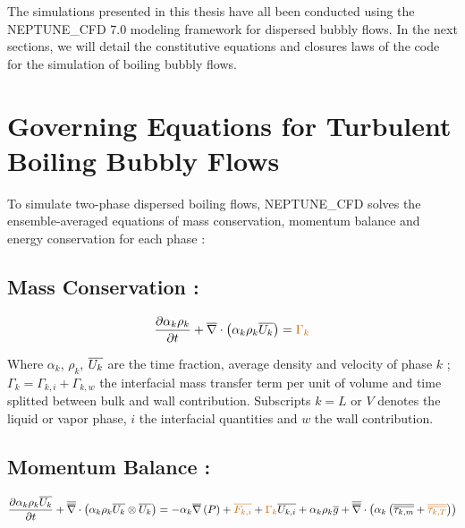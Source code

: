 \npar

The simulations presented in this thesis have all been conducted using the NEPTUNE\_CFD 7.0 modeling framework for dispersed bubbly flows. In the next sections, we will detail the constitutive equations and closures laws of the code for the simulation of boiling bubbly flows.


\section{Governing Equations for Turbulent Boiling Bubbly Flows}

To simulate two-phase dispersed boiling flows, NEPTUNE\_CFD solves the ensemble-averaged equations of mass conservation, momentum balance and energy conservation for each phase : 



\subsection{Mass Conservation :}
\begin{equation}
	\label{eq:mass}
	\dtime{\alpha_{k}\rho_{k}} + \divg{\alpha_{k}\rho_{k} \vect{U_{k}}} = \orangemath{\Gamma_{k}}
\end{equation}

Where $\alpha_{k}$, $\rho_{k}$, $\overline{U_{k}}$ are the time fraction, average density and velocity of phase $k$ ; $\Gamma_{k}=\Gamma_{k,i}+\Gamma_{k,w}$ the interfacial mass transfer term per unit of volume and time splitted between bulk and wall contribution.
Subscripts $k= L$ or $V$ denotes the liquid or vapor phase, $i$ the interfacial quantities and $w$ the wall contribution.

\subsection{Momentum Balance :}

\begin{equation}
	\label{eq:momentum}
	\dtime{\alpha_{k}\rho_{k}\vect{U_{k}}} + \vecdivg{\alpha_{k}\rho_{k} \vect{U_{k}}\otimes \vect{U_{k}}} = -\alpha_{k}\grad{P} + \orangemath{\vect{F_{k,i}}} + \orangemath{\Gamma_{k}}\vect{U_{k,i}} + \alpha_{k}\rho_{k}\vect{g} + \vecdivg{\alpha_{k} \parth{ \tens{\tau_{k,m}} + \orangemath{\tens{\tau_{k,T}}} }}
\end{equation}

